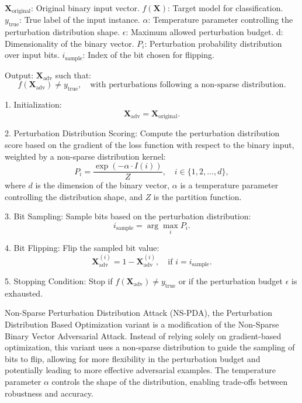 $\mathbf{X}_{\text{original}}$: Original binary input vector.  
$f(\mathbf{X})$: Target model for classification.  
$y_{\text{true}}$: True label of the input instance.  
$\alpha$: Temperature parameter controlling the perturbation distribution shape.  
$\epsilon$: Maximum allowed perturbation budget.  
d: Dimensionality of the binary vector.  
$P_i$: Perturbation probability distribution over input bits.  
$i_{\text{sample}}$: Index of the bit chosen for flipping.

Output: $\mathbf{X}_{\text{adv}}$ such that: 
\[
f(\mathbf{X}_{\text{adv}}) \neq y_{\text{true}}, \quad \text{with perturbations following a non-sparse distribution}.
\]

1. Initialization:  
   \[
   \mathbf{X}_{\text{adv}} = \mathbf{X}_{\text{original}}.
   \]

2. Perturbation Distribution Scoring:  
   Compute the perturbation distribution score based on the gradient of the loss function with respect to the binary input, weighted by a non-sparse distribution kernel:
   \[
   P_i = \frac{\exp\left(-\alpha \cdot I(i)\right)}{Z}, \quad i \in \{1, 2, \ldots, d\},
   \]
   where $d$ is the dimension of the binary vector, $\alpha$ is a temperature parameter controlling the distribution shape, and $Z$ is the partition function.

3. Bit Sampling:  
   Sample bits based on the perturbation distribution:
   \[
   i_{\text{sample}} = \arg\max_{i} P_i.
   \]

4. Bit Flipping:  
   Flip the sampled bit value:
   \[
   \mathbf{X}_{\text{adv}}^{(i)} = 1 - \mathbf{X}_{\text{adv}}^{(i)}, \quad \text{if } i = i_{\text{sample}}.
   \]

5. Stopping Condition:  
   Stop if $f(\mathbf{X}_{\text{adv}}) \neq y_{\text{true}}$ or if the perturbation budget $\epsilon$ is exhausted.

Non-Sparse Perturbation Distribution Attack (NS-PDA), the Perturbation Distribution Based Optimization variant is a modification of the Non-Sparse Binary Vector Adversarial Attack. Instead of relying solely on gradient-based optimization, this variant uses a non-sparse distribution to guide the sampling of bits to flip, allowing for more flexibility in the perturbation budget and potentially leading to more effective adversarial examples. The temperature parameter $\alpha$ controls the shape of the distribution, enabling trade-offs between robustness and accuracy.